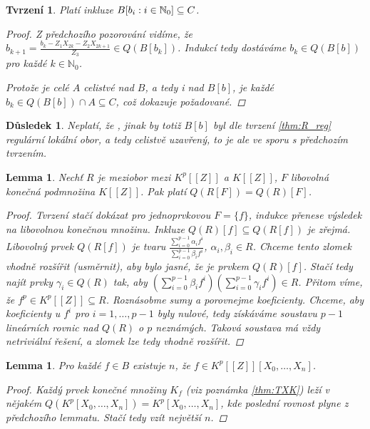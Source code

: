 \documentclass[11pt,a4paper]{article}
\newcommand\m[1]{\mathbb { #1 }} %
\newcommand\N{\m N}
\newcounter{numb}
\theoremstyle{definition}
\theoremstyle{plain}
\newtheorem{lemma}[numb]{Lemma}
\newtheorem{tvrzeni}[numb]{Tvrzení}
\newtheorem{dusledek}[numb]{Důsledek}
\begin{document}
\begin{tvrzeni}
	Platí inkluze $\Ball \subseteq C$.

	\begin{proof}
		Z předchozího pozorování vidíme, že $b_{k + 1} = \frac{b_k - Z_1 X_{2k} - Z_2 X_{2k + 1}}{Z_3} \in Q(B[b_k])$. Indukcí tedy dostáváme $b_k \in Q(B[b])$ pro každé $k \in \N_0$.

		Protože je celé $A$ celistvé nad $B$, a tedy i nad $B[b]$, je každé $b_k \in Q(B[b]) \cap A \subseteq C$, což dokazuje požadované.
	\end{proof}
\end{tvrzeni}

\begin{dusledek}
	Neplatí, že , jinak by totiž $B[b]$ byl dle tvrzení \ref{thm:R_reg} regulární lokální obor, a tedy celistvě uzavřený, to je ale ve sporu s předchozím tvrzením.
\end{dusledek}

\begin{lemma} \label{thm:QRf}
	Nechť $R$ je meziobor mezi $K^p[[Z]]$ a $K[[Z]]$, $F$ libovolná konečná podmnožina $K[[Z]]$. Pak platí $Q(R[F]) = Q(R)[F]$.
	
	\begin{proof}
		\newcommand*{\I}{_{i = 0}^{p - 1}}
		
		Tvrzení stačí dokázat pro jednoprvkovou $F = \{f\}$, indukce přenese výsledek na libovolnou konečnou množinu. Inkluze $Q(R)[f] \subseteq Q(R[f])$ je zřejmá. Libovolný prvek $Q(R[f])$ je tvaru $\frac{\sum\I \alpha_i f^i}{\sum\I \beta_i f^i}$, $\alpha_i, \beta_i \in R$. Chceme tento zlomek vhodně rozšířit (usměrnit), aby bylo jasné, že je prvkem $Q(R)[f]$. Stačí tedy najít prvky $\gamma_i \in Q(R)$ tak, aby $(\sum\I \beta_i f^i)(\sum\I \gamma_i f^i) \in R$. Přitom víme, že $f^p \in K^p[[Z]] \subseteq R$. Roznásobme sumy a porovnejme koeficienty. Chceme, aby koeficienty u $f^i$ pro $i = 1, \hdots, p - 1$ byly nulové, tedy získáváme soustavu $p - 1$ lineárních rovnic nad $Q(R)$ o $p$ neznámých. Taková soustava má vždy netriviální řešení, a zlomek lze tedy vhodně rozšířit.
	\end{proof}
\end{lemma}

\begin{lemma} \label{thm:B_vlastnost}
Pro každé $f \in B$ existuje $n$, že $f \in K^p[[Z]][X_0, \hdots, X_n]$.
	\begin{proof}
		Každý prvek konečné množiny $K_f$ (viz poznámka \ref{thm:TXK}) leží v nějakém $Q(K^p[X_0, \hdots, X_n]) = K^p[X_0, \hdots, X_n]$, kde poslední rovnost plyne z předchozího lemmatu. Stačí tedy vzít největší $n$.
	\end{proof}
\end{lemma}
\end{document}

